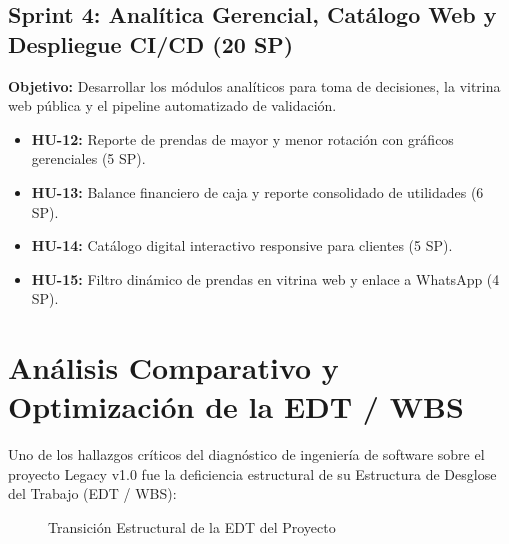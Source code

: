 \subsection{Sprint 4: Analítica Gerencial, Catálogo Web y Despliegue CI/CD (20 SP)}
\textbf{Objetivo:} Desarrollar los módulos analíticos para toma de decisiones, la vitrina web pública y el pipeline automatizado de validación.
\begin{itemize}
    \item \textbf{HU-12:} Reporte de prendas de mayor y menor rotación con gráficos gerenciales (5 SP).
    \item \textbf{HU-13:} Balance financiero de caja y reporte consolidado de utilidades (6 SP).
    \item \textbf{HU-14:} Catálogo digital interactivo responsive para clientes (5 SP).
    \item \textbf{HU-15:} Filtro dinámico de prendas en vitrina web y enlace a WhatsApp (4 SP).
\end{itemize}

\section{Análisis Comparativo y Optimización de la EDT / WBS}
Uno de los hallazgos críticos del diagnóstico de ingeniería de software sobre el proyecto Legacy v1.0 fue la deficiencia estructural de su Estructura de Desglose del Trabajo (EDT / WBS):

\begin{figure}[H]
\centering
{}
\caption{Transición Estructural de la EDT del Proyecto}
\label{fig:transicion_edt}
\end{figure}

